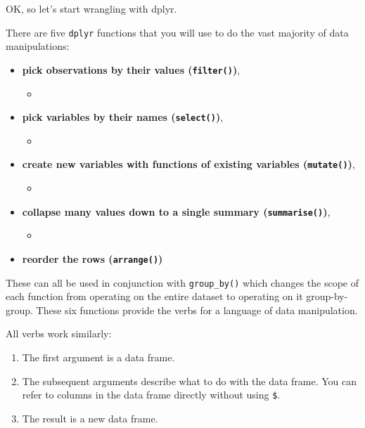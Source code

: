 \documentclass[]{book}
\providecommand{\tightlist}{%
  \setlength{\itemsep}{0pt}\setlength{\parskip}{0pt}}
\theoremstyle{definition}
\theoremstyle{definition}
\theoremstyle{definition}
\theoremstyle{remark}
\begin{document}
OK, so let's start wrangling with dplyr.

There are five \texttt{dplyr} functions that you will use to do the vast
majority of data manipulations:

\begin{itemize}
\tightlist
\item
  \textbf{pick observations by their values (\texttt{filter()})},

  \begin{itemize}
  \item
  \end{itemize}
\item
  \textbf{pick variables by their names (\texttt{select()})},

  \begin{itemize}
  \item
  \end{itemize}
\item
  \textbf{create new variables with functions of existing variables
  (\texttt{mutate()})},

  \begin{itemize}
  \item
  \end{itemize}
\item
  \textbf{collapse many values down to a single summary
  (\texttt{summarise()})},

  \begin{itemize}
  \item
  \end{itemize}
\item
  \textbf{reorder the rows (\texttt{arrange()})}
\end{itemize}

These can all be used in conjunction with \texttt{group\_by()} which
changes the scope of each function from operating on the entire dataset
to operating on it group-by-group. These six functions provide the verbs
for a language of data manipulation.

All verbs work similarly:

\begin{enumerate}
\def\labelenumi{\arabic{enumi}.}
\tightlist
\item
  The first argument is a data frame.
\item
  The subsequent arguments describe what to do with the data frame. You
  can refer to columns in the data frame directly without using
  \texttt{\$}.
\item
  The result is a new data frame.
\end{enumerate}
\end{document}
